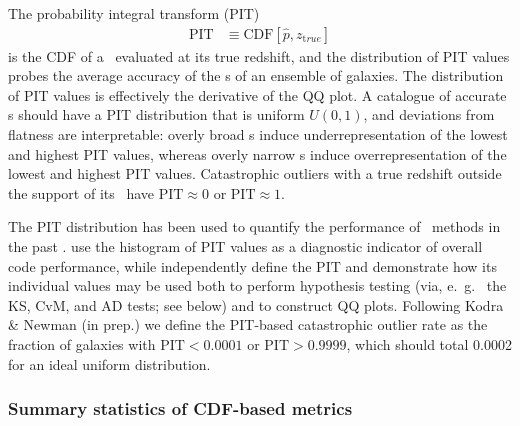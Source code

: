 The probability integral transform (PIT)
\begin{align}
\label{eq:pit}
\mathrm{PIT} &\equiv \mathrm{CDF}[\hat{p}, z_{\mathrm true}]
\end{align}
is the CDF of a \pzpdf\ evaluated at its true redshift, and the distribution of PIT values probes the average accuracy of the \pzpdf s of an ensemble of galaxies.
The distribution of PIT values is effectively the derivative of the QQ plot.
A catalogue of accurate \pzpdf s should have a PIT distribution that is uniform $U(0,1)$, and deviations from flatness are interpretable: overly broad \pzpdf s induce underrepresentation of the lowest and highest PIT values, whereas overly narrow \pzpdf s induce overrepresentation of the lowest and highest PIT values.
Catastrophic outliers with a true redshift outside the support of its \pzpdf\ have $\mathrm{PIT} \approx 0$ or $\mathrm{PIT} \approx 1$.

The PIT distribution has been used to quantify the performance of \pzpdf\ methods in the past \citep[e.~g.~][]{Bordoloi:10,Polsterer:16,Tanaka:17}.
\citet{Tanaka:17} use the histogram of PIT values as a diagnostic indicator of overall code performance, while \citet{Freeman:17} independently define the PIT and demonstrate how its individual values may be used both to perform hypothesis testing (via, e.~g.~ the KS, CvM, and AD tests; see below) and to construct QQ plots.
Following Kodra \& Newman (in prep.) we define the PIT-based catastrophic outlier rate as the fraction of galaxies with $\mathrm{PIT} < 0.0001$ or $\mathrm{PIT} > 0.9999$, which should total 0.0002 for an ideal uniform distribution.

\subsubsection{Summary statistics of CDF-based metrics}
\label{sec:summqqpit}

